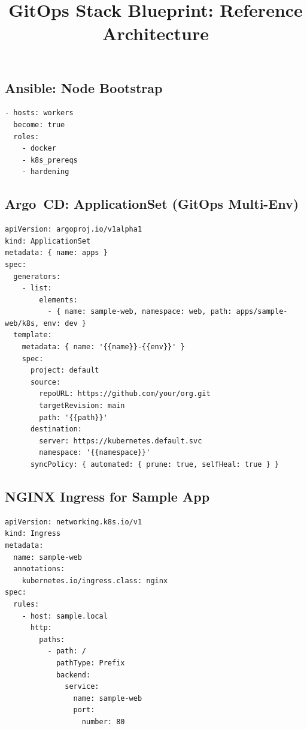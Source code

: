 \documentclass[11pt]{article}
\title{\textbf{GitOps Stack Blueprint: Reference Architecture}}
\author{}
\date{}
\begin{document}
\maketitle

\subsection{Ansible: Node Bootstrap}
\par
\begin{verbatim}
- hosts: workers
  become: true
  roles:
    - docker
    - k8s_prereqs
    - hardening
\end{verbatim}

\subsection{Argo~CD: ApplicationSet (GitOps Multi-Env)}
\par
\begin{verbatim}
apiVersion: argoproj.io/v1alpha1
kind: ApplicationSet
metadata: { name: apps }
spec:
  generators:
    - list:
        elements:
          - { name: sample-web, namespace: web, path: apps/sample-web/k8s, env: dev }
  template:
    metadata: { name: '{{name}}-{{env}}' }
    spec:
      project: default
      source:
        repoURL: https://github.com/your/org.git
        targetRevision: main
        path: '{{path}}'
      destination:
        server: https://kubernetes.default.svc
        namespace: '{{namespace}}'
      syncPolicy: { automated: { prune: true, selfHeal: true } }
\end{verbatim}

\subsection{NGINX Ingress for Sample App}
\par
\begin{verbatim}
apiVersion: networking.k8s.io/v1
kind: Ingress
metadata:
  name: sample-web
  annotations:
    kubernetes.io/ingress.class: nginx
spec:
  rules:
    - host: sample.local
      http:
        paths:
          - path: /
            pathType: Prefix
            backend:
              service:
                name: sample-web
                port:
                  number: 80
\end{verbatim}
\end{document}
